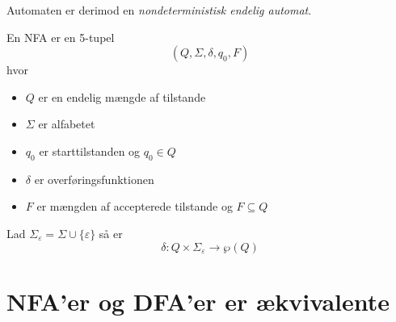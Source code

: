 \documentclass[a4paper,10pt,article]{memoir}
\begin{document}
Automaten er derimod en \emph{nondeterministisk endelig automat}. 

\begin{definition}
En NFA er en 5-tupel
%
\[ (Q,\Sigma,\delta,q_0,F)  \]
%
hvor
\begin{itemize}
\item $Q$  er en endelig mængde af tilstande
\item $\Sigma$ er alfabetet
\item $q_0$ er starttilstanden og $q_0 \in Q$
\item $\delta$ er overføringsfunktionen
\item $F$ er mængden af accepterede tilstande og $F \subseteq Q$
\end{itemize}

Lad $\Sigma_\varepsilon = \Sigma \cup \{\varepsilon\}$ så er
\[ \delta: Q \times \Sigma_\varepsilon \to \wp(Q) \]

\end{definition}

\chapter{NFA'er og DFA'er er ækvivalente}
\end{document}
